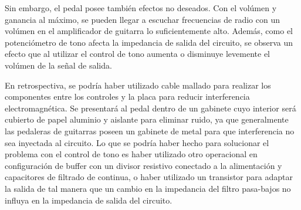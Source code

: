 Sin embargo, el pedal posee también efectos no deseados. Con el volúmen y ganancia al máximo, se pueden llegar a escuchar frecuencias de radio con un volúmen en el amplificador de guitarra lo suficientemente alto. Además, como el potenciómetro de tono afecta la impedancia de salida del circuito, se observa un efecto que al utilizar el control de tono aumenta o disminuye levemente el volúmen de la señal de salida.

En retrospectiva, se podría haber utilizado cable mallado para realizar los componentes entre los controles y la placa para reducir interferencia electromagnética. Se presentará al pedal dentro de un gabinete cuyo interior será cubierto de papel aluminio y aislante para eliminar ruido, ya que generalmente las pedaleras de guitarras poseen un gabinete de metal para que interferencia no sea inyectada al circuito.
Lo que se podría haber hecho para solucionar el problema con el control de tono es haber utilizado otro operacional en configuración de buffer con un divisor resistivo conectado a la alimentación y capacitores de filtrado de continua, o haber utilizado un transistor para adaptar la salida de tal manera que un cambio en la impedancia del filtro pasa-bajos no influya en la impedancia de salida del circuito.

